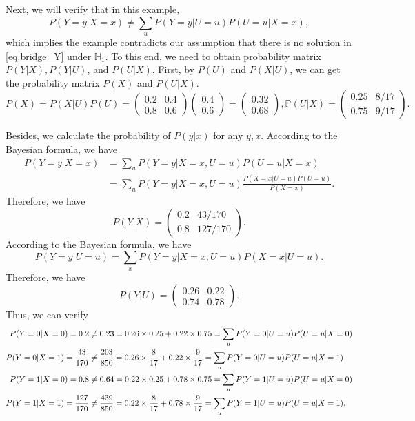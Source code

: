\documentclass[
  12pt]{article}
\def\mH{\mathbb{H}}
\begin{document}
Next, we will verify that in this example, 
\begin{equation*}
    P(Y=y|X=x)\ne \sum_u{P(Y=y|U=u)P(U=u|X=x)},
\end{equation*}
which implies the example contradicts our assumption that there is no solution in  \eqref{eq.bridge_Y} under $\mH_1$. To this end, we need to obtain probability matrix $P(Y|X),P(Y|U)$, and $P(U|X)$. First, by $P(U)$ and $P(X|U)$, we can get the probability matrix $P(X)$ and $P(U|X)$.
$$
P(X) =P(X|U)P(U)=\begin{pmatrix}
0.2&0.4\\
0.8&0.6
\end{pmatrix}\begin{pmatrix}
0.4\\0.6
\end{pmatrix}=\begin{pmatrix}
0.32\\0.68
\end{pmatrix}, \mathbb{P} (U|X) = \begin{pmatrix}
0.25&8/17\\
0.75&9/17
\end{pmatrix}.
$$


Besides, we calculate the probability of $P(y|x)$ for any $y,x$. According to the Bayesian formula, we have
$$
\begin{aligned}
	P(Y=y|X=x) &=\sum_u{P( Y=y|X=x,U=u)  P( U=u|X=x)}\\
	&=\sum_u{P( Y=y|X=x,U=u) \frac{P( X=x|U=u) P ( U=u )}{P( X=x)}}.
\end{aligned}
$$
Therefore, we have
$$
P( Y|X) =\begin{pmatrix}
0.2&43/170\\
0.8&127/170
\end{pmatrix}.
$$
According to the Bayesian formula, we have
$$
P( Y=y|U=u) =\sum_x{P( Y=y|X=x,U=u) P( X=x|U=u)}.
$$
Therefore, we have
$$
P( Y|U)=\begin{pmatrix}
0.26&0.22\\
0.74&0.78
\end{pmatrix}.
$$
Thus, we can verify
\begin{align*}
\allowdisplaybreaks
    P( Y=0|X=0) =0.2 
    & \ne 0.23=0.26\times 0.25+0.22\times 0.75=\sum_u{P(Y=0|U=u)P(U=u|X=0)}\\
	P( Y=0|X=1 ) =\frac{43}{170}&\ne \frac{203}{850}=0.26\times \frac{8}{17}+0.22\times \frac{9}{17}=\sum_u{P(Y=0|U=u)P(U=u|X=1)}\\
	P( Y=1|X=0 ) =0.8&\ne 0.64=0.22\times 0.25+0.78\times 0.75=\sum_u{P(Y=1|U=u)P(U=u|X=0)}\\
	P( Y=1|X=1 ) =\frac{127}{170}&\ne \frac{439}{850}=0.22\times \frac{8}{17}+0.78\times \frac{9}{17}=\sum_u{P(Y=1|U=u)P(U=u|X=1)}.
\end{align*}
\end{document}
